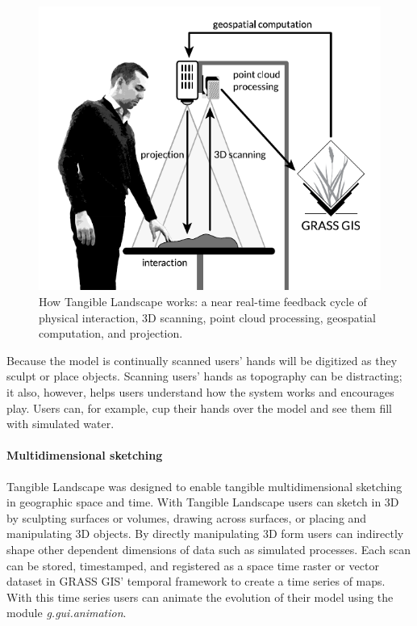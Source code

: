 \documentclass[prodmode,acmtochi]{acmsmall} %
\begin{document}
\begin{figure}
\begin{center}
		\includegraphics{images/system_schema.pdf}
	\caption{How Tangible Landscape works: a near real-time feedback cycle of physical interaction, 3D scanning, point cloud processing, geospatial computation, and projection.}
	\label{fig:system_schema}
\end{center}
\end{figure}

Because the model is continually scanned
users' hands will be digitized as they sculpt or place objects. 
Scanning users' hands as topography can be distracting; 
it also, however, helps users understand how the system works
and encourages play. 
Users can, for example, cup their hands over the model 
and see them fill with simulated water. 

\paragraph{Multidimensional sketching}
%
Tangible Landscape was designed to enable tangible multidimensional sketching
in geographic space and time. 
%
With Tangible Landscape users can sketch in 3D
by sculpting surfaces or volumes,
drawing across surfaces, 
or placing and manipulating 3D objects.
%
By directly manipulating 3D form 
users can indirectly shape other dependent dimensions of data 
such as simulated processes. 
%
Each scan can be stored, timestamped, and registered
as a space time raster or vector dataset %
in GRASS GIS' temporal framework
to create a time series of maps. 
%
With this time series users can animate the evolution of their model using the module 
\emph{g.gui.animation}\cite{g.gui.animation}.
\end{document}
